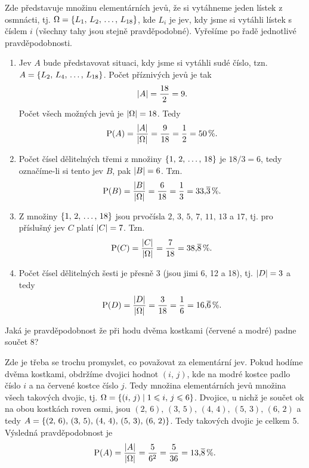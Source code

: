 \begin{solution}
    Zde představuje množinu elementárních jevů, že si vytáhneme jeden lístek z osmnácti, tj. $\Omega=\left\{L_1,\,L_2,\,\dots,\,L_{18}\right\}$, kde $L_i$ je jev, kdy jsme si vytáhli lístek s číslem $i$ (všechny tahy jsou stejně pravděpodobné). Vyřešíme po řadě jednotlivé pravděpodobnosti.\par
    \begin{enumerate}[label=(\alph*)]
        \item Jev $A$ bude představovat situaci, kdy jsme si vytáhli sudé číslo, tzn. $A=\left\{L_2,\,L_4,\,\dots,\,L_{18}\right\}$. Počet příznivých jevů je tak
        \[\left| A \right|=\dfrac{18}{2}=9.\]
        Počet všech možných jevů je $\left| \Omega \right|=18$. Tedy
        \[\operatorname{\text{P}}(A)=\dfrac{\left| A \right|}{\left| \Omega \right|}=\dfrac{9}{18}=\dfrac{1}{2}=50\,\%.\]
        \item Počet čísel dělitelných třemi z množiny $\left\{1,\,2,\,\dots,\,18\right\}$ je $18/3=6$, tedy označíme-li si tento jev $B$, pak $\left| B \right|=6$. Tzn.
        \[\operatorname{\text{P}}(B)=\dfrac{\left| B \right|}{\left| \Omega \right|}=\dfrac{6}{18}=\dfrac{1}{3}=33{,}\overline{3}\,\%.\]
        \item Z množiny $\left\{1,\,2,\,\dots,\,18\right\}$ jsou prvočísla $2,\,3,\,5,\,7,\,11,\,13$ a $17$, tj. pro příslušný jev $C$ platí $\left| C \right|=7$. Tzn.
        \[\operatorname{\text{P}}(C)=\dfrac{\left| C \right|}{\left| \Omega \right|}=\dfrac{7}{18}=38{,}\overline{8}\,\%.\]
        \item Počet čísel dělitelných šesti je přesně 3 (jsou jimi 6, 12 a 18), tj. $\left| D \right|=3$ a tedy
        \[\operatorname{\text{P}}(D)=\dfrac{\left| D \right|}{\left| \Omega \right|}=\dfrac{3}{18}=\dfrac{1}{6}=16{,}\overline{6}\,\%.\]
    \end{enumerate}
\end{solution}
\begin{task}
    Jaká je pravděpodobnost že při hodu dvěma kostkami (červené a modré) padne součet 8? \citep[sekce \emph{Pravděpodobnost a statistika}]{prikladyeu2022}
\end{task}
\begin{solution}
    Zde je třeba se trochu promyslet, co považovat za elementární jev. Pokud hodíme dvěma kostkami, obdržíme dvojici hodnot $(i,\,j)$, kde na modré kostce padlo číslo $i$ a na červené kostce číslo $j$. Tedy množina elementárních jevů množina všech takových dvojic, tj. $\Omega=\left\{(i,\,j) \;\middle\vert\; 1 \leqslant i,\,j \leqslant 6\right\}$. Dvojice, u nichž je součet ok na obou kostkách roven osmi, jsou $(2,\,6),\,(3,\,5),\,(4,\,4),\,(5,\,3),\,(6,\,2)$ a tedy $A=\left\{(2,\,6),\,(3,\,5),\,(4,\,4),\,(5,\,3),\,(6,\,2)\right\}$. Tedy takových dvojic je celkem 5. Výsledná pravděpodobnost je
    \[\operatorname{\text{P}}(A)=\dfrac{\left| A \right|}{\left| \Omega \right|}=\dfrac{5}{6^2}=\dfrac{5}{36}=13{,}\overline{8}\,\%.\]
\end{solution}